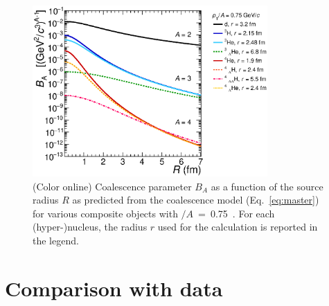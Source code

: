\documentclass{appolb}
\begin{document}
\begin{figure}[htb]
\begin{center}
\includegraphics[width=0.8\textwidth]{coalescenceBA075.eps}
\caption{(Color online) Coalescence parameter $B_A$ as a function of the source radius $R$ as predicted from the coalescence model (Eq.~\ref{eq:master}) for various composite objects with \pt$/A$~=~0.75~\GeVc. For each (hyper-)nucleus, the radius $r$ used for the calculation is reported in the legend.}
\label{Fig:BA}
\end{center}
\end{figure} 

\section{Comparison with data}
\end{document}
